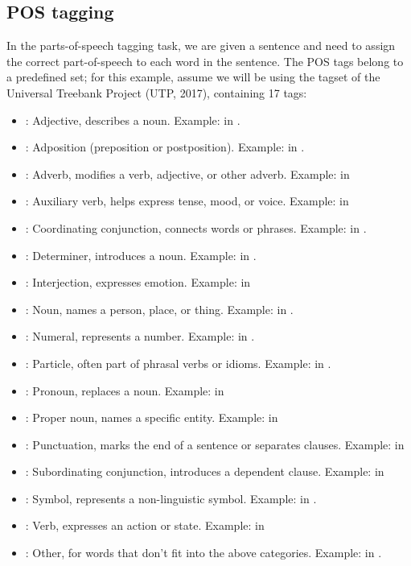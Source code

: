 \subsection{POS tagging}
In the parts-of-speech tagging task, we are given a sentence and need to assign the correct part-of-speech to each word in the sentence. The POS tags belong to a predefined set; for this example, assume we will be using the tagset of the Universal Treebank Project (UTP, 2017), containing 17 tags: 
\begin{itemize}
    \item {}: Adjective, describes a noun. Example:  in .
    \item {}: Adposition (preposition or postposition). Example:  in .
    \item {}: Adverb, modifies a verb, adjective, or other adverb. Example:  in 
    \item {}: Auxiliary verb, helps express tense, mood, or voice. Example:  in 
    \item {}: Coordinating conjunction, connects words or phrases. Example:  in .
    \item {}: Determiner, introduces a noun. Example:  in .
    \item {}: Interjection, expresses emotion. Example:  in 
    \item {}: Noun, names a person, place, or thing. Example:  in .
    \item {}: Numeral, represents a number. Example:  in .
    \item {}: Particle, often part of phrasal verbs or idioms. Example:  in .
    \item {}: Pronoun, replaces a noun. Example:  in 
    \item {}: Proper noun, names a specific entity. Example:  in 
    \item {}: Punctuation, marks the end of a sentence or separates clauses. Example:  in 
    \item {}: Subordinating conjunction, introduces a dependent clause. Example:  in 
    \item {}: Symbol, represents a non-linguistic symbol. Example: \qi{\$} in .
    \item {}: Verb, expresses an action or state. Example:  in 
    \item {}: Other, for words that don't fit into the above categories. Example:  in .
\end{itemize}

